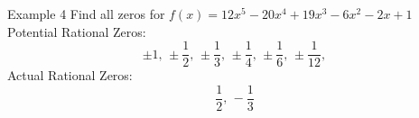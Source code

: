 \documentclass[t,usenames,dvipsnames]{beamer}
\begin{document}



\begin{frame}{Example 4}
Find all zeros for $f(x) = 12x^5 - 20x^4 + 19x^3 - 6x^2 - 2x + 1$   \newline\\  \pause
Potential Rational Zeros:
\[ \pm 1, \, \pm \frac{1}{2}, \, \pm \frac{1}{3}, \, \pm \frac{1}{4}, \, \pm \frac{1}{6}, \, \pm \frac{1}{12},\]
\pause
Actual Rational Zeros:
\[ \frac{1}{2}, \, -\frac{1}{3}\]
\end{frame}
\end{document}
